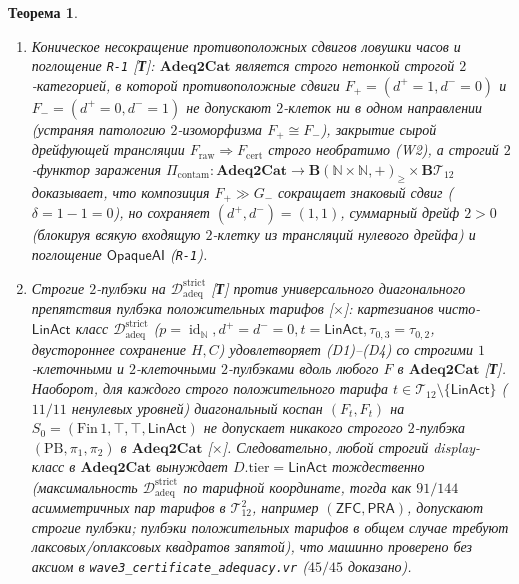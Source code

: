 \documentclass[11pt]{article}
\theoremstyle{plain}
\newtheorem{theorem}{Теорема}[section]
\theoremstyle{definition}
\DeclareMathOperator{\id}{id}
\begin{document}
\begin{theorem}
\begin{enumerate}[nosep,label=(\roman*)]
\item \emph{Коническое несокращение противоположных сдвигов ловушки часов и поглощение \texttt{R-1} \textup{[\textbf{Т}]}}: $\mathbf{Adeq2Cat}$ является строго нетонкой строгой $2$-категорией, в которой противоположные сдвиги $F_+ = (d^+=1, d^-=0)$ и $F_- = (d^+=0, d^-=1)$ не допускают $2$-клеток ни в одном направлении (устраняя патологию $2$-изоморфизма $F_+ \cong F_-$), закрытие сырой дрейфующей трансляции $F_{\mathrm{raw}} \Rightarrow F_{\mathrm{cert}}$ строго необратимо \textup{(W2)}, а строгий $2$-функтор заражения $\Pi_{\mathrm{contam}} : \mathbf{Adeq2Cat} \to \mathbf{B}(\mathbb{N}\times\mathbb{N}, +)_{\ge} \times \mathbf{B}\mathcal{T}_{12}$ доказывает, что композиция $F_+ \gg G_-$ сокращает знаковый сдвиг ($\delta = 1 - 1 = 0$), но сохраняет $(d^+, d^-) = (1, 1)$, суммарный дрейф $2 > 0$ (блокируя всякую входящую $2$-клетку из трансляций нулевого дрейфа) и поглощение $\mathsf{OpaqueAI}$ (\texttt{R-1}).
\item \emph{Строгие $2$-пулбэки на $\mathcal{D}_{\mathrm{adeq}}^{\mathrm{strict}}$ \textup{[\textbf{Т}]} против универсального диагонального препятствия пулбэка положительных тарифов \textup{[\textbf{$\times$}]}}: картезианов чисто-$\mathsf{LinAct}$ класс $\mathcal{D}_{\mathrm{adeq}}^{\mathrm{strict}}$ ($p = \id_{\mathbb{N}}, d^+ = d^- = 0, t = \mathsf{LinAct}, \tau_{0,3} = \tau_{0,2}$, двустороннее сохранение $H, C$) удовлетворяет \textup{(D1)--(D4)} со строгими $1$-клеточными и $2$-клеточными $2$-пулбэками вдоль любого $F$ в $\mathbf{Adeq2Cat}$ \textup{[\textbf{Т}]}. Наоборот, для \emph{каждого} строго положительного тарифа $t \in \mathcal{T}_{12} \setminus \{\mathsf{LinAct}\}$ ($11/11$ ненулевых уровней) диагональный коспан $(F_t, F_t)$ на $S_0 = (\mathrm{Fin}\,1, \top, \top, \mathsf{LinAct})$ \emph{не допускает} никакого строгого $2$-пулбэка $(\mathrm{PB}, \pi_1, \pi_2)$ в $\mathbf{Adeq2Cat}$ \textup{[\textbf{$\times$}]}. Следовательно, любой строгий display-класс в $\mathbf{Adeq2Cat}$ вынуждает $D.\mathrm{tier} = \mathsf{LinAct}$ тождественно (максимальность $\mathcal{D}_{\mathrm{adeq}}^{\mathrm{strict}}$ по тарифной координате, тогда как $91/144$ асимметричных пар тарифов в $\mathcal{T}_{12}^2$, например $(\mathsf{ZFC}, \mathsf{PRA})$, допускают строгие пулбэки; пулбэки положительных тарифов в общем случае требуют лаксовых/оплаксовых квадратов запятой), что машинно проверено без аксиом в \texttt{wave3\_certificate\_adequacy.vr} ($45/45$ доказано).
\end{enumerate}
\end{theorem}
\end{document}
